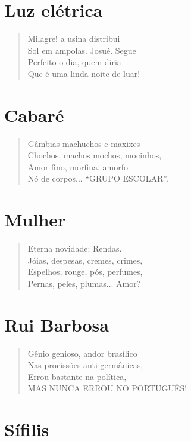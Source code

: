 \medskip
\section{Luz elétrica}

\begin{verse}
Milagre! a usina distribui\\
Sol em ampolas. Josué. Segue\\
Perfeito o dia, quem diria\\
Que é uma linda noite de luar!
\end{verse}


\medskip
\section{Cabaré}

\begin{verse}
Gâmbias-machuchos e maxixes\\
Chochos, machos mochos, mocinhos,\\
Amor fino, morfina, amorfo\\
Nó de corpos... ``GRUPO ESCOLAR''.
\end{verse}

\medskip
\section{Mulher}

\begin{verse}
Eterna novidade: Rendas.\\
Jóias, despesas, cremes, crimes,\\
Espelhos, rouge, pós, perfumes,\\
Pernas, peles, plumas... Amor?
\end{verse}

\medskip
\section{Rui Barbosa}

\begin{verse}
Gênio genioso, andor brasílico\\
Nas procissões anti-germânicas,\\
Errou bastante na política,\\
MAS NUNCA ERROU NO PORTUGUÊS!
\end{verse}

\medskip
\section{Sífilis}

